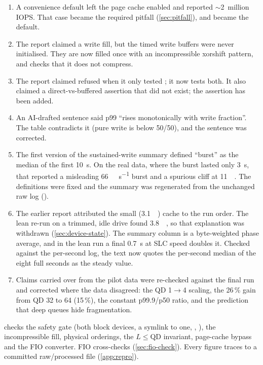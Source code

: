 \begin{description}[style=nextline]
\begin{enumerate}[nosep]
                latency; it now times each I/O to completion.
          \item A convenience default left the page cache enabled and reported
                \ensuremath{\sim}\num{2}~million IOPS. That case became the required pitfall
                (\cref{sec:pitfall}), and  became the default.
          \item The report claimed a  write fill, but the timed write buffers were never
                initialised. They are now filled once with an incompressible xorshift pattern, and
                 checks that it does not compress.
          \item The report claimed  refused  when it only tested
                ; it now tests both. It also claimed a direct-vs-buffered assertion that
                did not exist; the assertion has been added.
          \item An AI-drafted sentence said p99 \enquote{rises monotonically with write fraction}. The
                table contradicts it (pure write is below 50/50), and the sentence was corrected.
          \item The first version of the sustained-write summary defined \enquote{burst} as the median
                of the first \qty{10}{\second}. On the real data, where the burst lasted only
                \qty{3}{\second}, that reported a misleading \qty{66}{\mebi\byte\per\second} burst and a
                spurious cliff at \qty{11}{\gibi\byte}. The definitions were fixed and the summary was
                regenerated from the unchanged raw log ().
          \item The earlier report attributed the small (\qty{3.1}{\gibi\byte}) cache to the run order.
                The lean re-run on a trimmed, idle drive found \qty{3.8}{\gibi\byte}, so that
                explanation was withdrawn (\cref{sec:device-state}). The summary column
                 is a byte-weighted phase average, and in the lean run a final
                \qty{0.7}{\second} at SLC speed doubles it. Checked against the per-second log, the
                text now quotes the per-second median of the eight full seconds as the steady value.
          \item Claims carried over from the pilot data were re-checked against the final run and
                corrected where the data disagreed: the QD 1$\to$4 scaling, the 26\,\% gain from QD 32 to
                64 (15\,\%), the constant p99.9/p50 ratio, and the prediction that deep queues hide
                fragmentation.
        \end{enumerate}
  \item[Validation]  checks the safety gate (both block devices, a symlink to one,
        , \code{/}), the incompressible fill, physical orderings, the $L\le\text{QD}$
        invariant, page-cache bypass and the FIO converter. FIO cross-checks 
        (\cref{sec:fio-check}). Every figure traces to a committed raw/processed file
        (\cref{app:repro}).
\end{description}

